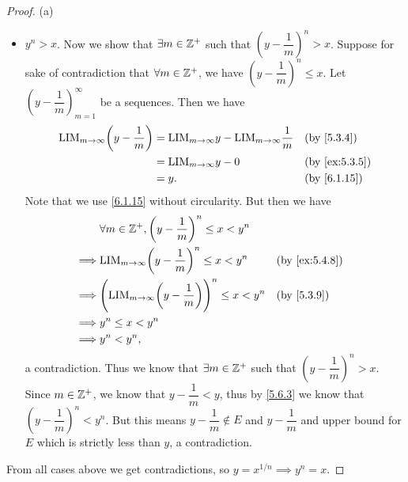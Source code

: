 \begin{proof}{(a)}
\begin{itemize}
          But this means \(y + \dfrac{1}{m} \in E\) and \(y + \dfrac{1}{m} \leq y\), a contradiction.
    \item \(y^n > x\).
          Now we show that \(\exists m \in \mathbb{Z}^+\) such that \((y - \dfrac{1}{m})^n > x\).
          Suppose for sake of contradiction that \(\forall m \in \mathbb{Z}^+\), we have \((y - \dfrac{1}{m})^n \leq x\).
          Let \((y - \dfrac{1}{m})_{m = 1}^\infty\) be a sequences.
          Then we have
          \begin{align*}
            \text{LIM}_{m \to \infty} \bigg(y - \dfrac{1}{m}\bigg) & = \text{LIM}_{m \to \infty} y - \text{LIM}_{m \to \infty} \dfrac{1}{m} &  & \by{5.3.4}    \\
                                                                   & = \text{LIM}_{m \to \infty} y - 0                                      &  & \by{ex:5.3.5} \\
                                                                   & = y.                                                                   &  & \by{6.1.15}
          \end{align*}
          Note that we use \cref{6.1.15} without circularity.
          But then we have
          \begin{align*}
                     & \forall m \in \Z^+, \bigg(y - \dfrac{1}{m}\bigg)^n \leq x < y^n                                      \\
            \implies & \text{LIM}_{m \to \infty} \bigg(y - \dfrac{1}{m}\bigg)^n \leq x < y^n             &  & \by{ex:5.4.8} \\
            \implies & \Bigg(\text{LIM}_{m \to \infty} \bigg(y - \dfrac{1}{m}\bigg)\Bigg)^n \leq x < y^n &  & \by{5.3.9}    \\
            \implies & y^n \leq x < y^n                                                                                     \\
            \implies & y^n < y^n,
          \end{align*}
          a contradiction.
          Thus we know that \(\exists m \in \mathbb{Z}^+\) such that \((y - \dfrac{1}{m})^n > x\).
          Since \(m \in \mathbb{Z}^+\), we know that \(y - \dfrac{1}{m} < y\), thus by \cref{5.6.3} we know that \((y - \dfrac{1}{m})^n < y^n\).
          But this means \(y - \dfrac{1}{m} \notin E\) and \(y - \dfrac{1}{m}\) and upper bound for \(E\) which is strictly less than \(y\), a contradiction.
  \end{itemize}
  From all cases above we get contradictions, so \(y = x^{1 / n} \implies y^n = x\).
\end{proof}

